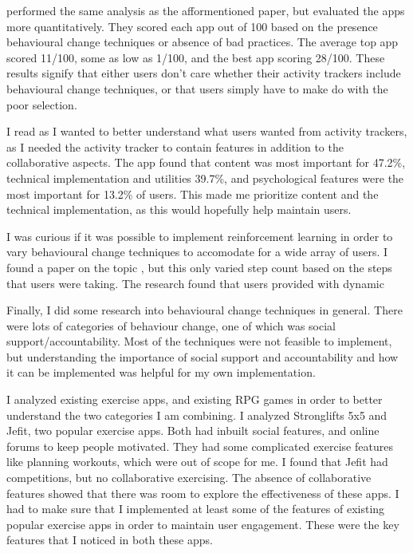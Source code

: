 \documentclass{l4proj}
\begin{document}
\citet{AppsOfSteel} performed the same analysis as the afformentioned paper, but evaluated the apps more quantitatively. They scored each app out of 100 based on the presence behavioural change techniques or absence of bad practices. The average top app scored 11/100, some as low as 1/100, and the best app scoring 28/100. These results signify that either users don't care whether their activity trackers include behavioural change techniques, or that users simply have to make do with the poor selection. 

I read \citet{User_expectations} as I wanted to better understand what users wanted from activity trackers, as I needed the activity tracker to contain features in addition to the collaborative aspects. The app found that content was most important for 47.2\%, technical implementation and utilities 39.7\%, and psychological features were the most important for 13.2\% of users. This made me prioritize content and the technical implementation, as this would hopefully help maintain users.

I was curious if it was possible to implement reinforcement learning in order to vary behavioural change techniques to accomodate for a wide array of users. I found a paper on the topic \citet{Personalizing}, but this only varied step count based on the steps that users were taking. The research found that users provided with dynamic 

Finally, I did some research into behavioural change techniques in general. There were lots of categories of behaviour change, one of which was social support/accountability. Most of the techniques were not feasible to implement, but understanding the importance of social support and accountability and how it can be implemented was helpful for my own implementation. \citep{Integrated_Theory}

I analyzed existing exercise apps, and existing RPG games in order to better understand the two categories I am combining. I analyzed Stronglifts 5x5 and Jefit, two popular exercise apps. Both had inbuilt social features, and online forums to keep people motivated. They had some complicated exercise features like planning workouts, which were out of scope for me. I found that Jefit had competitions, but no collaborative exercising. The absence of collaborative features showed that there was room to explore the effectiveness of these apps. I had to make sure that I implemented at least some of the features of existing popular exercise apps in order to maintain user engagement. These were the key features that I noticed in both these apps.
\end{document}
